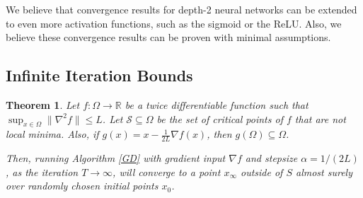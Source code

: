 \documentclass{article}
\newtheorem{theorem}{Theorem}[section]
\newcommand{\R}{{\mathbb{R}}}
\begin{document}

We believe that convergence results for depth-2 neural networks can be extended to even more activation functions, such as the sigmoid or the ReLU. Also, we believe these convergence results can be proven with minimal assumptions.


{\small
%
}

\newpage
\appendix
% 




% 



































\subsection{Infinite Iteration Bounds} 
\label{InfIter}


\begin{theorem}\cite{lee2016gradient, PanageasP16}\label{convStrict}
  Let $f :\Omega \to \R$ be a twice differentiable function such that
  $\sup_{x \in \Omega} \|\nabla^2 f\| \leq L$. Let
  $\mathcal{S} \subseteq \Omega$ be the set of critical points of $f$
  that are not local minima. Also, if
  $g(x) = x - \frac{1}{2L} \nabla f(x)$, then
  $g(\Omega) \subseteq \Omega$.

  Then, running Algorithm \ref{GD} with gradient input $\nabla f$ and
  stepsize $\alpha = 1/(2L)$, as the iteration $T \to\infty$, will
  converge to a point $x_\infty$ outside of $S$ almost surely over
  randomly chosen initial points $x_0$.
\end{theorem}
\end{document}
